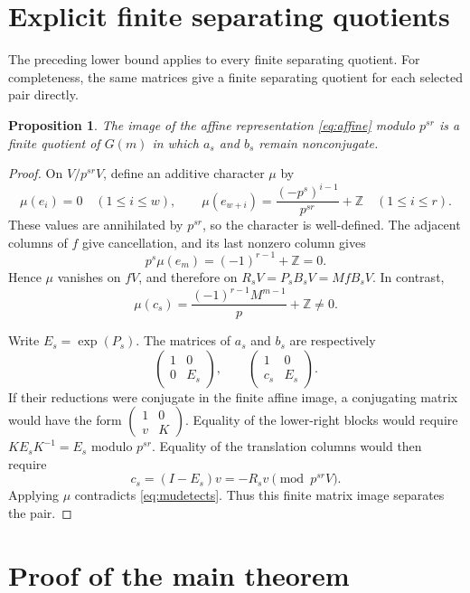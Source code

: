 \documentclass[11pt,letterpaper]{amsart}
\numberwithin{equation}{section}
\newtheorem{proposition}[theorem]{Proposition}
\theoremstyle{remark}
\newcommand{\Z}{\mathbb Z}
\begin{document}
\section{Explicit finite separating quotients}\label{sec:detectors}

The preceding lower bound applies to every finite separating quotient.
For completeness, the same matrices give a finite separating quotient
for each selected pair directly.

\begin{proposition}\label{prop:detector}
The image of the affine representation \eqref{eq:affine} modulo
$p^{sr}$ is a finite quotient of $G(m)$ in which $a_s$ and $b_s$
remain nonconjugate.
\end{proposition}

\begin{proof}
On $V/p^{sr}V$, define an additive character $\mu$ by
\[
 \mu(e_i)=0\quad(1\le i\le w),\qquad
 \mu(e_{w+i})=\frac{(-p^s)^{i-1}}{p^{sr}}+\Z
 \quad(1\le i\le r).
\]
These values are annihilated by $p^{sr}$, so the character is
well-defined. The adjacent columns of $f$ give cancellation, and its
last nonzero column gives
\[
 p^s\mu(e_m)=(-1)^{r-1}+\Z=0.
\]
Hence $\mu$ vanishes on $fV$, and therefore on
$R_sV=P_sB_sV=MfB_sV$. In contrast,
\begin{equation}\label{eq:mudetects}
 \mu(c_s)=\frac{(-1)^{r-1}M^{m-1}}p+\Z\ne0.
\end{equation}

Write $E_s=\exp(P_s)$. The matrices of $a_s$ and $b_s$ are
respectively
\[
 \begin{pmatrix}1&0\\0&E_s\end{pmatrix},\qquad
 \begin{pmatrix}1&0\\c_s&E_s\end{pmatrix}.
\]
If their reductions were conjugate in the finite affine image, a
conjugating matrix would have the form
$\left(\begin{smallmatrix}1&0\\v&K\end{smallmatrix}\right)$.
Equality of the lower-right blocks would require
$KE_sK^{-1}=E_s$ modulo $p^{sr}$. Equality of the translation
columns would then require
\[
 c_s=(I-E_s)v=-R_sv\pmod{p^{sr}V}.
\]
Applying $\mu$ contradicts \eqref{eq:mudetects}. Thus this finite
matrix image separates the pair.
\end{proof}

\section{Proof of the main theorem}\label{sec:finish}
\end{document}
